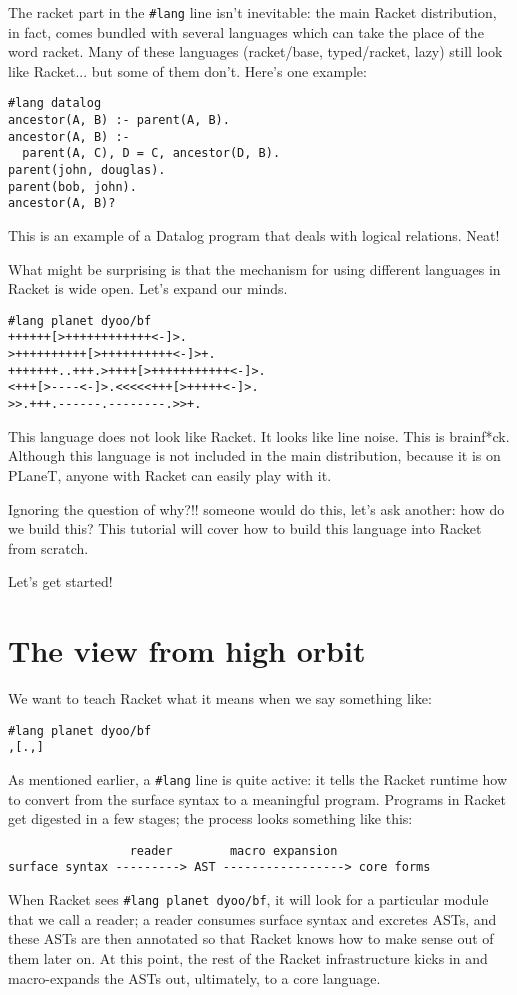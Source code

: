 \documentclass{article}
\begin{document}
The racket part in the \verb+#lang+ line isn't inevitable: the main Racket distribution, in fact, comes bundled with several languages which can take the place of the word racket. Many of these languages (racket/base, typed/racket, lazy) still look like Racket... but some of them don't. Here's one example:
\begin{verbatim}
#lang datalog
ancestor(A, B) :- parent(A, B).
ancestor(A, B) :-
  parent(A, C), D = C, ancestor(D, B).
parent(john, douglas).
parent(bob, john).
ancestor(A, B)?
\end{verbatim}
This is an example of a Datalog program that deals with logical relations. Neat!


What might be surprising is that the mechanism for using different languages in Racket is wide open. Let's expand our minds.
\begin{verbatim}
#lang planet dyoo/bf
++++++[>++++++++++++<-]>.
>++++++++++[>++++++++++<-]>+.
+++++++..+++.>++++[>+++++++++++<-]>.
<+++[>----<-]>.<<<<<+++[>+++++<-]>.
>>.+++.------.--------.>>+.
\end{verbatim}
This language does not look like Racket. It looks like line noise. This is brainf*ck. Although this language is not included in the main distribution, because it is on PLaneT, anyone with Racket can easily play with it.


Ignoring the question of why?!! someone would do this, let's ask another: how do we build this? This tutorial will cover how to build this language into Racket from scratch.

Let's get started!

\section{The view from high orbit}
We want to teach Racket what it means when we say something like:
\begin{verbatim}
#lang planet dyoo/bf
,[.,]
\end{verbatim}
As mentioned earlier, a \verb+#lang+ line is quite active: it tells the Racket runtime how to convert from the surface syntax to a meaningful program. Programs in Racket get digested in a few stages; the process looks something like this:

\begin{verbatim}
                 reader        macro expansion
surface syntax ---------> AST -----------------> core forms
\end{verbatim}

When Racket sees \verb+#lang planet dyoo/bf+, it will look for a particular module that we call a reader; a reader consumes surface syntax and excretes ASTs, and these ASTs are then annotated so that Racket knows how to make sense out of them later on. At this point, the rest of the Racket infrastructure kicks in and macro-expands the ASTs out, ultimately, to a core language.
\end{document}
